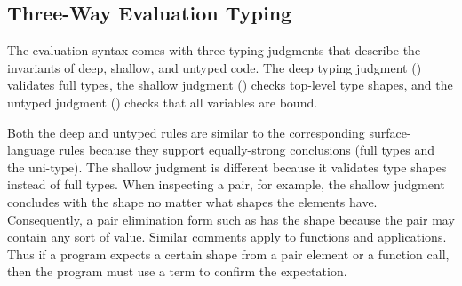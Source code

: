 \documentclass[screen=true, natbib=false, 10pt, sigplan]{acmart}
\let\SOriginalthesubsubsection\thesubsubsection
\newcommand{\Ssubsection}[2]{\subsection[#1]{#2}\let\thesubsubsection\SOriginalthesubsubsection}
\begin{document}
\Ssubsection{Three{-}Way Evaluation Typing}{Three{-}Way Evaluation Typing}\label{t:x28part_x22secx3amodelx3amodelx3aevalx2dtypesx22x29}

The evaluation syntax comes with three typing judgments that describe the
invariants of deep, shallow, and untyped code.
The deep typing judgment (\relax{$\sWTD$}) validates full types,
the shallow judgment (\relax{$\sWTS$}) checks top{-}level type shapes,
and the untyped judgment (\relax{$\sWTU$}) checks that all variables
are bound.

Both the deep and untyped rules are similar to the corresponding
surface{-}language rules because they support equally{-}strong conclusions
(full types and the uni{-}type).
The shallow judgment is different because it validates type
shapes instead of full types.
When inspecting a pair, for example, the shallow judgment concludes with the \relax{$\kpair$}
shape no matter what shapes the elements have.
Consequently, a pair elimination form such as  has the
\relax{$\kany$} shape because the pair may contain any sort of value.
Similar comments apply to functions and applications.
Thus if a program expects a certain shape from a pair element or a
function call, then the program must use a \relax{$\sscan$} term to
confirm the expectation.
\end{document}
